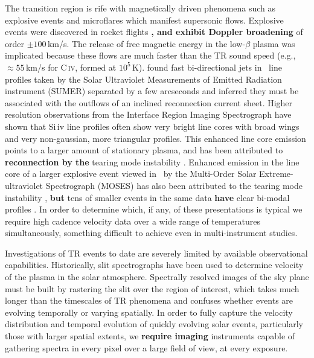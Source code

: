 \documentclass[linenumbers,trackchanges]{aastex63}
\begin{document}
    The transition region is rife with magnetically driven phenomena such as explosive events \cite[e.g.,][]{dere1991} and microflares \citep{gontikakis2012} which manifest supersonic flows.
    Explosive events were discovered in rocket flights \citep{Dere1989}\textbf{, and exhibit Doppler broadening} of order $\pm 100$\,km/s. 
    The release of free magnetic energy in the low-$\beta$ plasma was implicated because these flows are much faster than the TR sound speed (e.g., $\approx55$\,km/s  for C\,\textsc{iv}, formed at $10^5$\,K).
\citet{innes1997} found fast bi-directional jets in \siiv \ line profiles taken by the Solar Ultraviolet Measurements of Emitted Radiation instrument (SUMER)  \citep{SUMER} separated by a few arcseconds and inferred they must be associated with the outflows of an inclined reconnection current sheet.
    Higher resolution observations from the Interface Region Imaging Spectrograph \citep[IRIS]{depontieu2014} have shown that Si\,{\sc iv} line profiles often show very bright line cores with broad wings and very non-gaussian, more triangular profiles.
    This enhanced line core emission points to a larger amount of stationary plasma, and has been attributed to \textbf{reconnection by the} tearing mode instability \citep{Innes2015}.
    Enhanced emission in the line core of a larger explosive event viewed in \heii \ by the Multi-Order Solar Extreme-ultraviolet Spectrograph (MOSES)  has also been attributed to the tearing mode instability \citep{Fox2010}, \textbf{but} tens of smaller events in the same data \textbf{have} clear bi-modal profiles \citep{Rust2019}.
    In order to determine which, if any, of these presentations is typical we require high cadence velocity data over a wide range of temperatures simultaneously, something difficult to achieve even in multi-instrument studies.
    
    Investigations of TR events to date are severely limited by available observational capabilities. 
    Historically, slit spectrographs have been used to determine velocity of the plasma in the solar atmosphere.   
    Spectrally resolved images of the sky plane must be built by rastering the slit over the region of interest, which takes much longer than the timescales of TR phenomena and confuses whether events are evolving temporally or varying spatially.  
    In order to fully capture the velocity distribution and temporal evolution of quickly evolving solar events, particularly those with larger spatial extents, we \textbf{require imaging} instruments capable of gathering spectra in every pixel over a large field of view, at every exposure.
    
\end{document}
